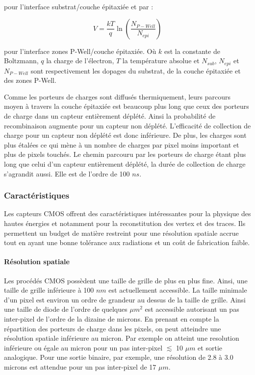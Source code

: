    pour l'interface substrat/couche \'epitaxi\'ee et par : 
   
  \begin{equation}
   V = \dfrac{kT}{q} \ln \left( \dfrac{N_{P-Well}}{N_{epi}} \right)
  \end{equation}
   
   pour l'interface zones P-Well/couche \'epitaxi\'ee. O\`u $k$ est la constante de Boltzmann, $q$ la charge de l'\'electron, $T$ la temp\'erature absolue et $N_{sub}$, $N_{epi}$ et $N_{P-Well}$ sont respectivement les dopages du substrat, de la couche \'epitaxi\'ee et des zones P-Well.
   
   \medskip
   
   Comme les porteurs de charges sont diffus\'es thermiquement, leurs parcours moyen \`a travers la couche \'epitaxi\'ee est beaucoup plus long que ceux des porteurs de charge dans un capteur enti\`erement d\'epl\'et\'e. Ainsi la probabilit\'e de recombinaison augmente pour un capteur non d\'epl\'et\'e. L'efficacit\'e de collection de charge pour un capteur non d\'epl\'et\'e est donc inf\'erieure. De plus, les charges sont plus \'etal\'ees ce qui m\`ene \`a un nombre de charges par pixel moins important et plus de pixels touch\'es. Le chemin parcouru par les porteurs de charge \'etant plus long que celui d'un capteur enti\`erement d\'epl\'et\'e, la dur\'ee de collection de charge s'agrandit aussi. Elle est de l'ordre de 100 $ns$.

  \subsubsection{Caract\'eristiques}
  
  Les capteurs CMOS offrent des caract\'eristiques int\'eressantes pour la physique des hautes \'energies et notamment pour la reconstitution des vertex et des traces. Ils permettent un budget de mati\`ere restreint pour une r\'esolution spatiale accrue tout en ayant une bonne tol\'erance aux radiations et un co\^ut de fabrication faible.
  
  \paragraph{R\'esolution spatiale}
  
  Les proc\'ed\'es CMOS poss\`edent une taille de grille de plus en plus fine. Ainsi, une taille de grille inf\'erieure \`a 100 $nm$ est actuellement accessible. La taille minimale d'un pixel est environ un ordre de grandeur au dessus de la taille de grille. Ainsi une taille de diode de l'ordre de quelques $\mu m^2$ est accessible autorisant un pas inter-pixel de l'ordre de la dizaine de microns. En prenant en compte la r\'epartition des porteurs de charge dans les pixels, on peut atteindre une r\'esolution spatiale inf\'erieure au micron. Par exemple on atteint une resolution inf\'erieure ou \'egale au micron pour un pas inter-pixel $\lesssim$ 10 $\mu m$ et sortie analogique. Pour une sortie binaire, par exemple, une r\'esolution de 2.8 \`a 3.0 microns est attendue pour un pas inter-pixel de 17 $\mu m$.
  
